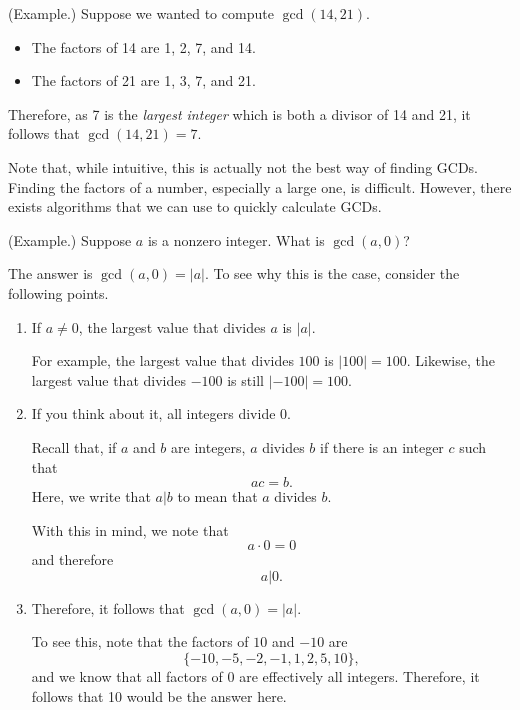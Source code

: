 \documentclass[letterpaper]{article}
\begin{document}
\begin{mdframed}
    (Example.) Suppose we wanted to compute $\gcd(14, 21)$. 
    \begin{itemize}
        \item The factors of 14 are 1, 2, 7, and 14.
        \item The factors of 21 are 1, 3, 7, and 21. 
    \end{itemize}
    Therefore, as 7 is the \emph{largest integer} which is both a divisor of 14 and 21, it follows that $\gcd(14, 21) = 7$.
\end{mdframed}
Note that, while intuitive, this is actually not the best way of finding GCDs. Finding the factors of a number, especially a large one, is difficult. However, there exists algorithms that we can use to quickly calculate GCDs.

\begin{mdframed}
    (Example.) Suppose $a$ is a nonzero integer. What is $\gcd(a, 0)$?

    \begin{mdframed}
        The answer is $\gcd(a, 0) = |a|$. To see why this is the case, consider the following points. 

        \begin{enumerate}
            \item If $a \neq 0$, the largest value that divides $a$ is $|a|$. 
            \begin{mdframed}
                For example, the largest value that divides $100$ is $|100| = 100$. Likewise, the largest value that divides $-100$ is still $|-100| = 100$. 
            \end{mdframed}

            \item If you think about it, all integers divide 0. 
            \begin{mdframed}
                Recall that, if $a$ and $b$ are integers, $a$ divides $b$ if there is an integer $c$ such that 
                \[ac = b.\]
                Here, we write that $a | b$ to mean that $a$ divides $b$. 

                \bigskip 

                With this in mind, we note that 
                \[a \cdot 0 = 0\]
                and therefore 
                \[a | 0.\]
            \end{mdframed}

            \item Therefore, it follows that $\gcd(a, 0) = |a|$. 
            \begin{mdframed}
                To see this, note that the factors of $10$ and $-10$ are 
                \[\{-10, -5, -2, -1, 1, 2, 5, 10\},\]
                and we know that all factors of $0$ are effectively all integers. Therefore, it follows that 10 would be the answer here. 
            \end{mdframed}
        \end{enumerate}
    \end{mdframed}
\end{mdframed}
\end{document}
